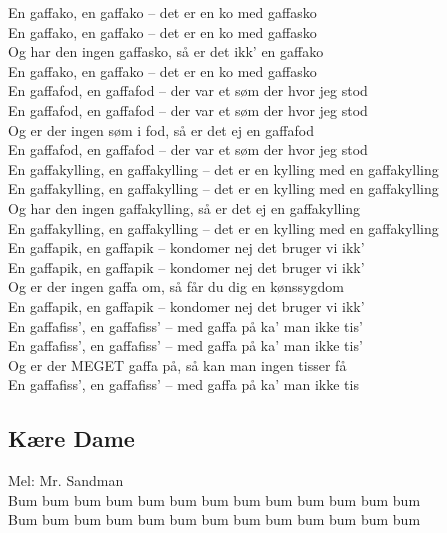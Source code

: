 En gaffako, en gaffako – det er en ko med gaffasko\\
En gaffako, en gaffako – det er en ko med gaffasko\\
Og har den ingen gaffasko, så er det ikk’ en gaffako\\
En gaffako, en gaffako – det er en ko med gaffasko\\

En gaffafod, en gaffafod – der var et søm der hvor jeg stod\\
En gaffafod, en gaffafod – der var et søm der hvor jeg stod\\
Og er der ingen søm i fod, så er det ej en gaffafod\\
En gaffafod, en gaffafod – der var et søm der hvor jeg stod\\

En gaffakylling, en gaffakylling – det er en kylling med en gaffakylling\\
En gaffakylling, en gaffakylling – det er en kylling med en gaffakylling\\
Og har den ingen gaffakylling, så er det ej en gaffakylling\\
En gaffakylling, en gaffakylling – det er en kylling med en gaffakylling\\

En gaffapik, en gaffapik – kondomer nej det bruger vi ikk’\\
En gaffapik, en gaffapik – kondomer nej det bruger vi ikk’\\
Og er der ingen gaffa om, så får du dig en kønssygdom\\
En gaffapik, en gaffapik – kondomer nej det bruger vi ikk’\\

En gaffafiss’, en gaffafiss’ – med gaffa på ka’ man ikke tis’\\
En gaffafiss’, en gaffafiss’ – med gaffa på ka’ man ikke tis’\\
Og er der MEGET gaffa på, så kan man ingen tisser få\\
En gaffafiss’, en gaffafiss’ – med gaffa på ka’ man ikke tis\\

\subsection*{Kære Dame}

Mel: Mr. Sandman\\

Bum bum bum bum bum bum bum bum bum bum bum bum bum\\
Bum bum bum bum bum bum bum bum bum bum bum bum bum\\

